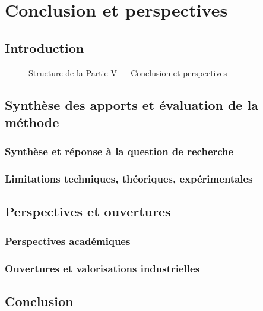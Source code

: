 \documentclass[ twoside,openright,titlepage,numbers=noenddot,headinclude,%
                footinclude=true,cleardoublepage=empty,abstractoff, %
                BCOR=5mm,paper=a4,fontsize=11pt,%
                french,american,%
                ]{scrreprt}
\begin{document}
\part{Conclusion et perspectives}

\chapter*{Introduction}


\begin{figure}[h!]
    \centering
    
    \caption{Structure de la Partie V — Conclusion et perspectives}
\end{figure}

\chapter{Synthèse des apports et évaluation de la méthode}

\section{Synthèse et réponse à la question de recherche}

\section{Limitations techniques, théoriques, expérimentales}

\chapter{Perspectives et ouvertures}
\section{Perspectives académiques}
\section{Ouvertures et valorisations industrielles}

\chapter*{Conclusion}


\cleardoublepage
{}
{}
\end{document}
